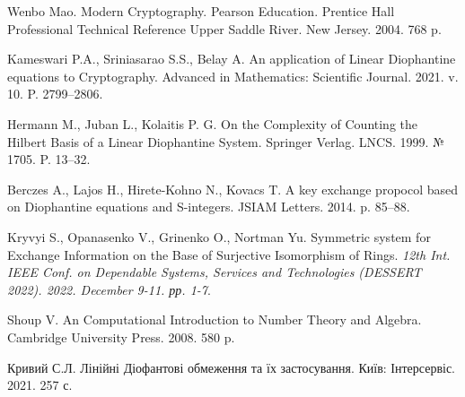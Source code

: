 \documentclass{ceurart}
\begin{document}
\begin{thebibliography}{99} %

 Wenbo Mao.
 Modern Cryptography.
 Pearson Education. Prentice Hall Professional
Technical Reference Upper Saddle River. New Jersey. 2004.
768 p.

 Kameswari P.A., Sriniasarao S.S., Belay A.
 An application of Linear Diophantine equations to Cryptography.
 Advanced in Mathematics: Scientific Journal. 2021. v. 10.
            P. 2799--2806.

 Hermann M., Juban L., Kolaitis P. G.
 On the Complexity of Counting the Hilbert Basis of
          a Linear Diophantine System.
 Springer Verlag. LNCS. 1999. № 1705. %
          P. 13--32.

 Berczes A., Lajos H., Hirete-Kohno N., Kovacs T.
 A key exchange propocol based on Diophantine equations and S-integers.
 JSIAM Letters. 2014. p. 85--88.

 Kryvyi S., Opanasenko V., Grinenko O., Nortman Yu.
 Symmetric system for Exchange Information on the Base of
Surjective Isomorphism of Rings.
 {\em 12th Int. IEEE Conf. on Dependable Systems, Services and
Technologies (DESSERT 2022). 2022. December 9-11. рр. 1-7}.

 Shoup V.
 An Computational Introduction to Number Theory and Algebra.
 Cambridge University Press. 2008. 580 p.

 Кривий С.Л.
 Лінійні Діофантові обмеження та їх застосування.
 Київ: Інтерсервіс. 2021. 257 с.

\end{thebibliography}

\end{document}
